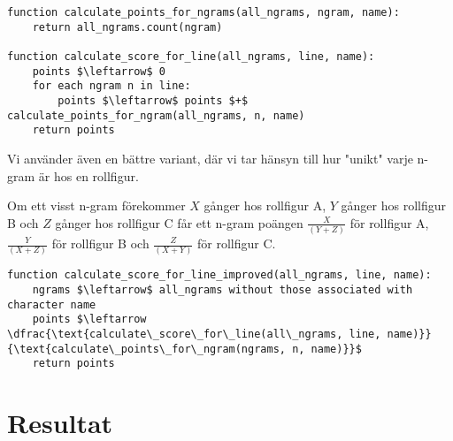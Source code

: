 \documentclass[a4paper]{article}
\begin{document}
\begin{lstlisting}[mathescape, columns=fullflexible, basicstyle=\fontfamily{lmvtt}\selectfont]
function calculate_points_for_ngrams(all_ngrams, ngram, name):
    return all_ngrams.count(ngram)

function calculate_score_for_line(all_ngrams, line, name):
    points $\leftarrow$ 0
    for each ngram n in line:
        points $\leftarrow$ points $+$ calculate_points_for_ngram(all_ngrams, n, name)
    return points
\end{lstlisting}

Vi använder även en bättre variant, där vi tar hänsyn till hur "unikt" varje
n-gram är hos en rollfigur.

Om ett visst n-gram förekommer $X$ gånger hos rollfigur A, $Y$ gånger hos rollfigur B
och $Z$ gånger hos rollfigur C får ett n-gram poängen $\frac{X}{(Y+Z)}$ för rollfigur A,
$\frac{Y}{(X+Z)}$ för rollfigur B och $\frac{Z}{(X+Y)}$ för rollfigur C.

\begin{lstlisting}[mathescape, columns=fullflexible, basicstyle=\fontfamily{lmvtt}\selectfont]
function calculate_score_for_line_improved(all_ngrams, line, name):
    ngrams $\leftarrow$ all_ngrams without those associated with character name 
    points $\leftarrow  \dfrac{\text{calculate\_score\_for\_line(all\_ngrams, line, name)}}{\text{calculate\_points\_for\_ngram(ngrams, n, name)}}$
    return points
\end{lstlisting}

\section{Resultat}
\end{document}
